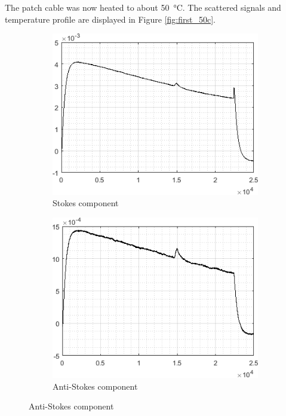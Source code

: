 \documentclass{standalone}
\begin{document}
The patch cable was now heated to about \SI{50}{\celsius}. The scattered signals and temperature profile are displayed in Figure \ref{fig:first_50c}.
\begin{figure}[h]
	\centering
	\begin{subfigure}[b]{0.49\textwidth}
		\includegraphics[width=\textwidth]{first_50c_stokes.png}
		\caption{Stokes component}
	\end{subfigure}
	\begin{subfigure}[b]{0.49\textwidth}
		\includegraphics[width=\textwidth]{first_50c_antistokes.png}
		\caption{Anti-Stokes component}
	\end{subfigure}

\end{figure}
\end{document}
